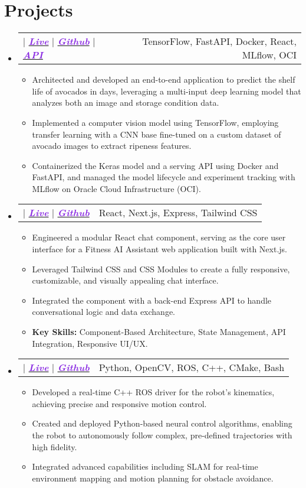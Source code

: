 \documentclass[a4paper,11pt]{article}
\makeatletter
\newcommand{\resumeItem}[1]{
  \item\small{
    {#1 \vspace{-2pt}}
  }
}
\newcommand{\resumeProjectHeading}[2]{
    \item
    \begin{tabular*}{1\textwidth}{l@{\extracolsep{\fill}}r}
      \small#1 & #2 \\
    \end{tabular*}\vspace{-7pt}
}
\newcommand{\resumeSubHeadingListStart}{\begin{itemize}[leftmargin=0in, label={}]}
\newcommand{\resumeSubHeadingListEnd}{\end{itemize}}
\newcommand{\resumeItemListStart}{\begin{itemize}[leftmargin=0.15in, nosep]}
\newcommand{\resumeItemListEnd}{\end{itemize}\vspace{-2pt}}
\makeatother
\begin{document}
\section{\Large{Projects}}
\resumeSubHeadingListStart
\resumeProjectHeading
{\textbf{\large{\AvocadoTitle}} $|$ \emph{\href{\AvocadoLiveURL}{\textcolor{BlueViolet}{\textbf{Live}}}} $|$ \emph{\href{\AvocadoGithubURL}{\textcolor{BlueViolet}{\textbf{Github}}}} $|$ \emph{\href{\AvocadoAPIURL}{\textcolor{BlueViolet}{\textbf{API}}}}}
{TensorFlow, FastAPI, Docker, React, MLflow, OCI}
\resumeItemListStart
\resumeItem{Architected and developed an end-to-end application to predict the shelf life of avocados in days, leveraging a multi-input deep learning model that analyzes both an image and storage condition data.}
\resumeItem{Implemented a computer vision model using TensorFlow, employing transfer learning with a CNN base fine-tuned on a custom dataset of avocado images to extract ripeness features.}
\resumeItem{Containerized the Keras model and a serving API using Docker and FastAPI, and managed the model lifecycle and experiment tracking with MLflow on Oracle Cloud Infrastructure (OCI).}
\resumeItemListEnd
\resumeProjectHeading
{\textbf{\large{\ChatTitle}} $|$ \emph{\href{\ChatLiveURL}{\textcolor{BlueViolet}{\textbf{Live}}}} $|$ \emph{\href{\ChatGithubURL}{\textcolor{BlueViolet}{\textbf{Github}}}}}
{React, Next.js, Express, Tailwind CSS}
\resumeItemListStart
\resumeItem{Engineered a modular React chat component, serving as the core user interface for a Fitness AI Assistant web application built with Next.js.}
\resumeItem{Leveraged Tailwind CSS and CSS Modules to create a fully responsive, customizable, and visually appealing chat interface.}
\resumeItem{Integrated the component with a back-end Express API to handle conversational logic and data exchange.}
\resumeItem{\textbf{Key Skills:} Component-Based Architecture, State Management, API Integration, Responsive UI/UX.}
\resumeItemListEnd
\resumeProjectHeading
{\textbf{\large{\OmniTitle}} $|$ \emph{\href{\OmniLiveURL}{\textcolor{BlueViolet}{\textbf{Live}}}} $|$ \emph{\href{\OmniGithubURL}{\textcolor{BlueViolet}{\textbf{Github}}}}}
{Python, OpenCV, ROS, C++, CMake, Bash}
\resumeItemListStart
\resumeItem{Developed a real-time C++ ROS driver for the robot's kinematics, achieving precise and responsive motion control.}
\resumeItem{Created and deployed Python-based neural control algorithms, enabling the robot to autonomously follow complex, pre-defined trajectories with high fidelity.}
\resumeItem{Integrated advanced capabilities including SLAM for real-time environment mapping and motion planning for obstacle avoidance.}
\resumeItemListEnd
\resumeSubHeadingListEnd
\end{document}
